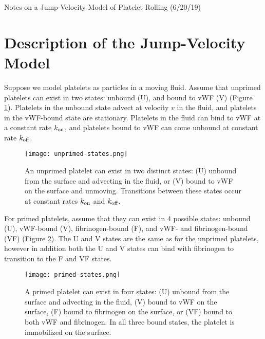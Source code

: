 \documentclass{article}
\newcommand{\tn}{\textnormal}
\begin{document}
\pagestyle{plain}

\begin{center}
  {\Large Notes on a Jump-Velocity Model of Platelet Rolling (6/20/19)}
\end{center}

\section{Description of the Jump-Velocity Model}
\label{sec:jump-vel}

Suppose we model platelets as particles in a moving fluid. Assume that
unprimed platelets can exist in two states: unbound (U), and bound to
vWF (V) (Figure \ref{fig:unprimed-states}). Platelets in the unbound
state advect at velocity $v$ in the fluid, and platelets in the
vWF-bound state are stationary. Platelets in the fluid can bind to vWF
at a constant rate $k_\tn{on}$, and platelets bound to vWF can come
unbound at constant rate $k_\tn{off}$.

\begin{figure}[h]
  \centering
  \texttt{[image: unprimed-states.png]}
  \caption[Possible states of unprimed platelets]{An unprimed platelet
    can exist in two distinct states: (U) unbound from the surface and
    advecting in the fluid, or (V) bound to vWF on the surface and
    unmoving. Transitions between these states occur at constant rates
    $k_\tn{on}$ and $k_\tn{off}$.}
  \label{fig:unprimed-states}
\end{figure}

For primed platelets, assume that they can exist in 4 possible states:
unbound (U), vWF-bound (V), fibrinogen-bound (F), and vWF- and
fibrinogen-bound (VF) (Figure \ref{fig:primed-states}). The U and V
states are the same as for the unprimed platelets, however in addition
both the U and V states can bind with fibrinogen to transition to the
F and VF states.

\begin{figure}[h]
  \centering
  \texttt{[image: primed-states.png]}
  \caption[Possible states of primed platelets]{A primed platelet can
    exist in four states: (U) unbound from the surface and advecting
    in the fluid, (V) bound to vWF on the surface, (F) bound to
    fibrinogen on the surface, or (VF) bound to both vWF and
    fibrinogen. In all three bound states, the platelet is immobilized
    on the surface.}
  \label{fig:primed-states}
\end{figure}
\end{document}
